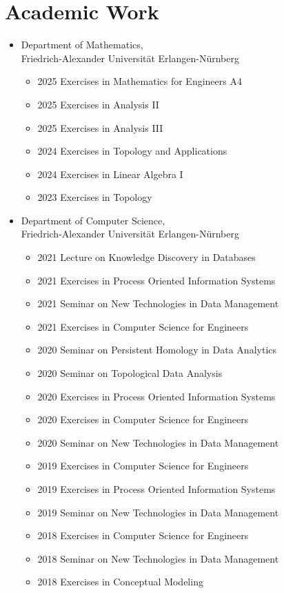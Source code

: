 \documentclass[a4paper, 11pt]{article}
\newcommand{\years}[1]{\marginnote{\scriptsize #1}}
\begin{document}
\newpage
\section*{Academic Work}
\years{Teaching}
\vspace{-2pt}
\begin{itemize}[noitemsep, leftmargin=*]
	\item Department of Mathematics, \\
	      Friedrich-Alexander Universität Erlangen-Nürnberg
	      \begin{itemize}
	      	\item 2025 Exercises in Mathematics for Engineers A4
	      	\item 2025 Exercises in Analysis II
	      	\item 2025 Exercises in Analysis III
	      	\item 2024 Exercises in Topology and Applications
	      	\item 2024 Exercises in Linear Algebra I
	      	\item 2023 Exercises in Topology
	      \end{itemize}
	\item Department of Computer Science, \\
	      Friedrich-Alexander Universität Erlangen-Nürnberg
	      \begin{itemize}
	      	\item 2021 Lecture on Knowledge Discovery in Databases
	      	\item 2021 Exercises in Process Oriented Information Systems
	      	\item 2021 Seminar on New Technologies in Data Management
	      	\item 2021 Exercises in Computer Science for Engineers
	      	\item 2020 Seminar on Persistent Homology in Data Analytics
	      	\item 2020 Seminar on Topological Data Analysis
	      	\item 2020 Exercises in Process Oriented Information Systems
	      	\item 2020 Exercises in Computer Science for Engineers
	      	\item 2020 Seminar on New Technologies in Data Management
	      	\item 2019 Exercises in Computer Science for Engineers
	      	\item 2019 Exercises in Process Oriented Information Systems
	      	\item 2019 Seminar on New Technologies in Data Management
	      	\item 2018 Exercises in Computer Science for Engineers
	      	\item 2018 Seminar on New Technologies in Data Management
	      	\item 2018 Exercises in Conceptual Modeling
	      \end{itemize}
\end{itemize}
\vspace{10pt}
\end{document}
